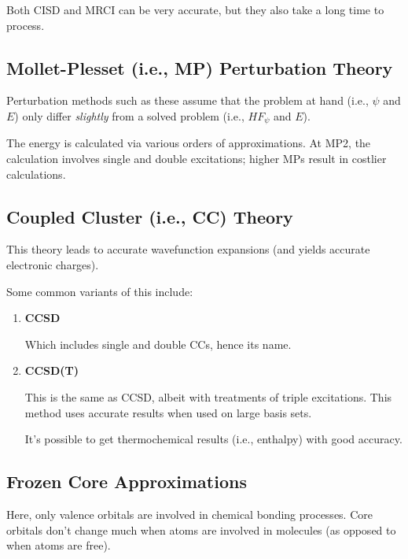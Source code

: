 \documentclass[
  letterpaper,
  DIV=11,
  numbers=noendperiod]{scrreprt}
\begin{document}
Both CISD and MRCI can be very accurate, but they also take a long time
to process.

\hypertarget{mollet-plesset-i.e.-mp-perturbation-theory}{%
\subsection{Mollet-Plesset (i.e., MP) Perturbation
Theory}\label{mollet-plesset-i.e.-mp-perturbation-theory}}

Perturbation methods such as these assume that the problem at hand
(i.e., \(\psi\) and \(E\)) only differ \emph{slightly} from a solved
problem (i.e., \(HF_{\psi}\) and \(E\)).

The energy is calculated via various orders of approximations. At MP2,
the calculation involves single and double excitations; higher MPs
result in costlier calculations.

\hypertarget{coupled-cluster-i.e.-cc-theory}{%
\subsection{Coupled Cluster (i.e., CC)
Theory}\label{coupled-cluster-i.e.-cc-theory}}

This theory leads to accurate wavefunction expansions (and yields
accurate electronic charges).

Some common variants of this include:

\begin{enumerate}
\def\labelenumi{\arabic{enumi}.}
\item
  \textbf{CCSD}

  Which includes single and double CCs, hence its name.
\item
  \textbf{CCSD(T)}

  This is the same as CCSD, albeit with treatments of triple
  excitations. This method uses accurate results when used on large
  basis sets.

  It's possible to get thermochemical results (i.e., enthalpy) with good
  accuracy.
\end{enumerate}

\hypertarget{frozen-core-approximations}{%
\subsection{Frozen Core
Approximations}\label{frozen-core-approximations}}

Here, only valence orbitals are involved in chemical bonding processes.
Core orbitals don't change much when atoms are involved in molecules (as
opposed to when atoms are free).
\end{document}
